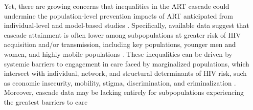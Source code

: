 \par
Yet, there are growing concerns that inequalities in the ART cascade
could undermine the population-level prevention impacts of ART
anticipated from individual-level and model-based studies
\cite{Baral2019,Green2020,Maheu-Giroux2024}.
Specifically, available data suggest that cascade attainment is often lower
among subpopulations at greater risk of HIV acquisition and/or transmission,
including key populations, younger men and women, and highly mobile populations
\cite{Hakim2018,Green2020}.
These inequalities can be driven by
systemic barriers to engagement in care faced by marginalized populations,
which intersect with individual, network, and structural determinants of HIV risk,
such as economic insecurity, mobility, stigma, discrimination, and criminalization
\cite{Wanyenze2016,Schwartz2017,Schmidt-Sane2022}.
Moreover, cascade data may be lacking entirely
for subpopulations experiencing the greatest barriers to care
